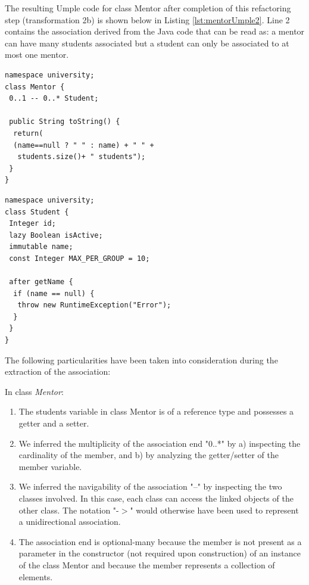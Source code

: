 The resulting Umple code for class Mentor after completion of this refactoring step (transformation 2b) is shown below in Listing \ref{lst:mentorUmple2}. Line 2 contains the association derived from the Java code that can be read as: a mentor can have many students associated but a student can only be associated to at most one mentor. 

\begin{lstlisting}[style=UmpleOut,caption=Mentor.ump,label=lst:mentorUmple2]
namespace university;
class Mentor {
 0..1 -- 0..* Student; 
 
 public String toString() {
  return(
  (name==null ? " " : name) + " " +
   students.size()+ " students");
 }
}
\end{lstlisting}

\begin{lstlisting}[style=UmpleOut,caption=Student.ump,label=lst:studentUmple2]
namespace university;
class Student {
 Integer id; 
 lazy Boolean isActive; 
 immutable name; 
 const Integer MAX_PER_GROUP = 10; 
 
 after getName {
  if (name == null) { 
   throw new RuntimeException("Error");
  }
 }
}
\end{lstlisting}

The following particularities have been taken into consideration during the extraction of the association:

In class \textit{Mentor}:
\begin{enumerate}
\item The students variable in class Mentor is of a reference type and possesses a getter and a setter.
\item We inferred the multiplicity of the association end "0..*" by a) inspecting the cardinality of the member, and b) by analyzing the getter/setter of the member variable.
\item We inferred the navigability of the association "--" by inspecting the two classes involved. In this case, each class can access the linked objects of the other class.  The notation "-$>$" would otherwise have been used to represent a unidirectional association. 

\item The association end is optional-many because the member is not present as a parameter in the constructor (not required upon construction) of an instance of the class Mentor and because the member represents a collection of elements. 
\end{enumerate}

